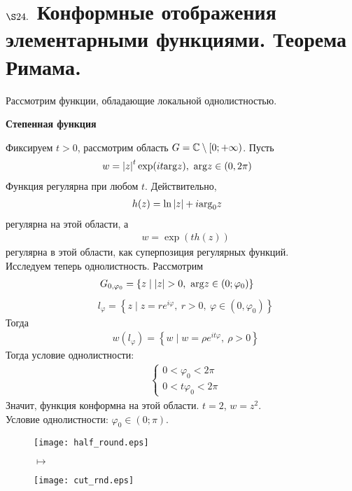 \section{$\S 24.$ Конформные отображения элементарными функциями. Теорема Римама.}
Рассмотрим функции, обладающие локальной однолистностью.
\begin{center}
    \textbf{Степенная функция}
\end{center}
Фиксируем $t > 0$, рассмотрим область $G = \mathbb{C} \setminus [0;+\infty)$. Пусть
\begin{align*}
  & w = \left| z \right|^t \exp(it \mathrm{arg} z), \ \mathrm{arg} z \in (0, 2 \pi)
\end{align*}
Функция регулярна при любом $t$. Действительно,
\begin{align*}
  & h(z) = \ln \left| z \right| + i \mathrm{arg}_0 z
\end{align*}
регулярна на этой области, а
\begin{align*}
  & w = \exp(t h(z))
\end{align*}
регулярна в этой области, как суперпозиция регулярных функций.
\\
Исследуем теперь однолистность. Рассмотрим
\begin{align*}
  & G_{0,\varphi_0} = \left\{ z \mid \left| z \right| > 0, \ \argt z \in (0; \varphi_0)\right\}
\end{align*}
\begin{align*}
  & l_{\varphi} = \left\{ z \mid z = r e^{i \varphi}, \ r > 0, \ \varphi \in (0, \varphi_0)\right\}
\end{align*}
Тогда
\begin{align*}
  & w(l_\varphi) = \left\{ w \mid w = \rho e^{i t \varphi}, \ \rho > 0 \right\}
\end{align*}
Тогда условие однолистности:
\begin{align*}
  & \begin{cases}
      0 < \varphi_0 < 2 \pi \\
      0 < t \varphi_0 < 2 \pi
  \end{cases}
\end{align*}
Значит, функция конформна на этой области.
\Example
$t = 2$, $w = z^2$.
\\
Условие однолистности: $\varphi_0 \in (0; \pi)$.
\begin{figure}[h!]
    \begin{minipage}[c]{0.45\textwidth}
        \centering
        \texttt{[image: half\_round.eps]}
    \end{minipage}
    \begin{minipage}[c]{0.1\textwidth}
        \centering
        \LARGE{$\mapsto$}
    \end{minipage}
    \begin{minipage}[c]{0.45\textwidth}
        \centering
        \texttt{[image: cut\_rnd.eps]}
    \end{minipage}
    \label{fig:24.1}
\end{figure}
